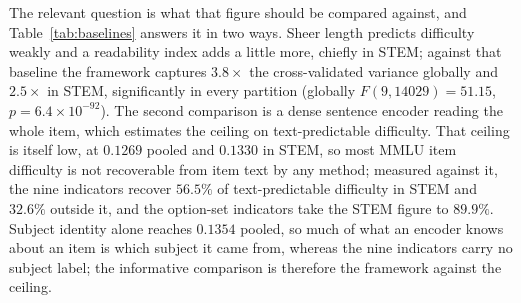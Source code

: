The relevant question is what that figure should be compared against, and Table~\ref{tab:baselines} answers it in two ways. Sheer length predicts difficulty weakly and a readability index adds a little more, chiefly in STEM; against that baseline the framework captures $3.8 \times$ the cross-validated variance globally and $2.5 \times$ in STEM, significantly in every partition (globally $F(9,14029) = 51.15$, $p = 6.4 \times 10^{-92}$). The second comparison is a dense sentence encoder reading the whole item, which estimates the ceiling on text-predictable difficulty. That ceiling is itself low, at $0.1269$ pooled and $0.1330$ in STEM, so most MMLU item difficulty is not recoverable from item text by any method; measured against it, the nine indicators recover $56.5\%$ of text-predictable difficulty in STEM and $32.6\%$ outside it, and the option-set indicators take the STEM figure to $89.9\%$. Subject identity alone reaches $0.1354$ pooled, so much of what an encoder knows about an item is which subject it came from, whereas the nine indicators carry no subject label; the informative comparison is therefore the framework against the ceiling.

